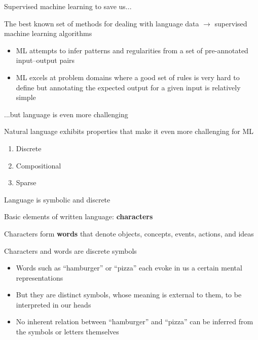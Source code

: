 \documentclass[12pt,aspectratio=169,handout]{beamer}
\begin{document}
\begin{frame}{Supervised machine learning to save us...}
	
	The best known set of methods for dealing with language data $\to$ supervised machine learning algorithms
	\begin{itemize}
		\item ML attempts to infer patterns and regularities from a set of pre-annotated input--output pairs
		\item ML excels at problem domains where a good set of rules is very hard to
		define but annotating the expected output for a given input is relatively simple
	\end{itemize}
	
\end{frame}


\begin{frame}{...but language is even more challenging}
	
	Natural language exhibits properties that make it even more challenging for ML
	
	\begin{enumerate}
		\item Discrete
		\item Compositional
		\item Sparse
	\end{enumerate}
	
\end{frame}

\begin{frame}{Language is symbolic and discrete}
	
	Basic elements of written language: \textbf{characters}
	
	Characters form \textbf{words} that denote objects, concepts, events, actions, and ideas
	
	\begin{block}{Characters and words are discrete symbols}
		\begin{itemize}
			\item Words such as ``hamburger'' or ``pizza'' each evoke in us a certain mental representations
			\item But they are distinct symbols, whose meaning is external to them, to be interpreted in our heads
			\item No inherent relation between ``hamburger'' and ``pizza'' can be inferred from the symbols or letters themselves
		\end{itemize}
	\end{block}
	
\end{frame}
\end{document}

